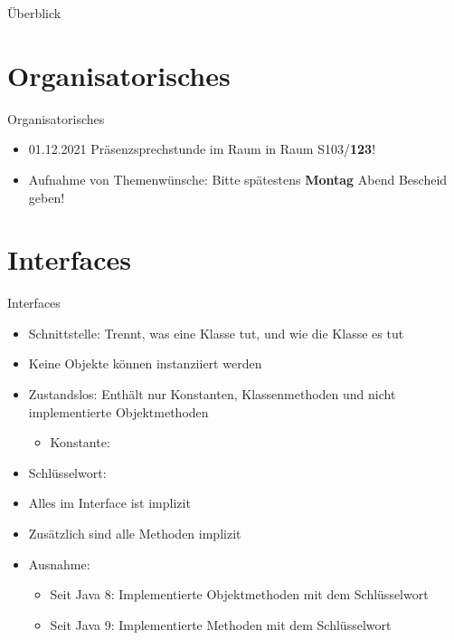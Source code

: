 \documentclass{../tuda-beamer}
\date{24. November 2021}
\begin{document}
    \maketitle

    \begin{frame}{Überblick}
        \tableofcontents
    \end{frame}


    \section{Organisatorisches}
    \begin{frame}{Organisatorisches}
        \begin{itemize}
            \item 01.12.2021 Präsenzsprechstunde im Raum in Raum S103/\textbf{123}!
            \item Aufnahme von Themenwünsche: Bitte spätestens \textbf{Montag} Abend Bescheid geben!
        \end{itemize}
    \end{frame}


    \section{Interfaces}
    \begin{frame}{Interfaces}
        \begin{itemize}
            \item Schnittstelle: Trennt, was eine Klasse tut, und wie die Klasse es tut
            \item Keine Objekte können instanziiert werden
            \item Zustandslos: Enthält nur Konstanten, Klassenmethoden und nicht implementierte
            Objektmethoden
            \begin{itemize}
                \item Konstante: 
            \end{itemize}
            \item Schlüsselwort: 
            \item Alles im Interface ist implizit 
            \item Zusätzlich sind alle Methoden implizit 
            \item Ausnahme:
            \begin{itemize}
                \item Seit Java 8: Implementierte Objektmethoden mit dem Schlüsselwort
                \item Seit Java 9: Implementierte Methoden mit dem Schlüsselwort
            \end{itemize}
        \end{itemize}
    \end{frame}
\end{document}
